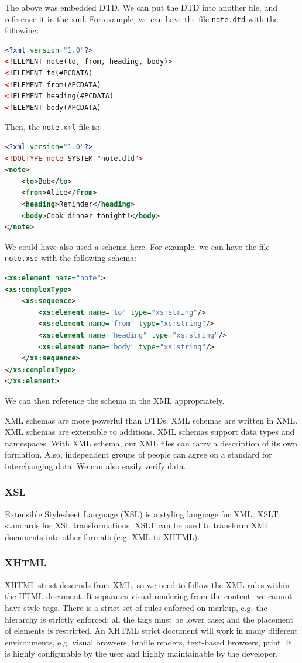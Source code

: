 \documentclass[a4paper, openany]{memoir}
\begin{document}
\noindent The above was embedded DTD. We can put the DTD into another file, and reference it in the xml. For example, we can have the file \texttt{note.dtd} with the following:
\begin{lstlisting}[language=xml]
<?xml version="1.0"?>
<!ELEMENT note(to, from, heading, body)>
<!ELEMENT to(#PCDATA)
<!ELEMENT from(#PCDATA)
<!ELEMENT heading(#PCDATA)
<!ELEMENT body(#PCDATA)
\end{lstlisting}
Then, the \texttt{note.xml} file is:
\begin{lstlisting}[language=xml]
<?xml version="1.0"?>
<!DOCTYPE note SYSTEM "note.dtd">
<note>
    <to>Bob</to>
    <from>Alice</from>
    <heading>Reminder</heading>
    <body>Cook dinner tonight!</body>
</note>
\end{lstlisting}
We could have also used a schema here. For example, we can have the file \texttt{note.xsd} with the following schema:
\begin{lstlisting}[language=xml]
<xs:element name="note">
<xs:complexType>
    <xs:sequence>
        <xs:element name="to" type="xs:string"/>
        <xs:element name="from" type="xs:string"/>
        <xs:element name="heading" type="xs:string"/>
        <xs:element name="body" type="xs:string"/>
    </xs:sequence>
</xs:complexType>
</xs:element>
\end{lstlisting}
We can then reference the schema in the XML appropriately.

\noindent XML schemas are more powerful than DTDs. XML schemas are written in XML. XML schemas are extensible to additions. XML schemas support data types and namespaces. With XML schema, our XML files can carry a description of its own formation. Also, independent groups of people can agree on a standard for interchanging data. We can also easily verify data.

\subsubsection{XSL}
Extensible Stylesheet Language (XSL) is a styling language for XML. XSLT standards for XSL transformations. XSLT can be used to transform XML documents into other formats (e.g. XML to XHTML). 

\subsubsection{XHTML}
XHTML strict descends from XML, so we need to follow the XML rules within the HTML document. It separates visual rendering from the content- we cannot have style tags. There is a strict set of rules enforced on markup, e.g. the hierarchy is strictly enforced; all the tags must be lower case; and the placement of elements is restricted. An XHTML strict document will work in many different environments, e.g. visual browsers, braille readers, text-based browsers, print. It is highly configurable by the user and highly maintainable by the developer.
\end{document}
